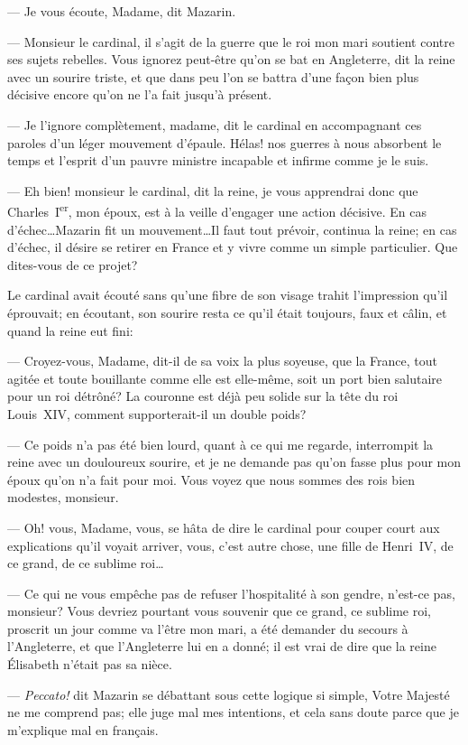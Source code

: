— Je vous écoute, Madame, dit Mazarin.

— Monsieur le cardinal, il s'agit de la guerre que le roi mon mari soutient contre ses sujets rebelles. Vous ignorez peut-être qu'on se bat en Angleterre, dit la reine avec un sourire triste, et que dans peu l'on se battra d'une façon bien plus décisive encore qu'on ne l'a fait jusqu'à présent.

— Je l'ignore complètement, madame, dit le cardinal en accompagnant ces paroles d'un léger mouvement d'épaule. Hélas! nos guerres à nous absorbent le temps et l'esprit d'un pauvre ministre incapable et infirme comme je le suis.

— Eh bien! monsieur le cardinal, dit la reine, je vous apprendrai donc que Charles~I\textsuperscript{er}, mon époux, est à la veille d'engager une action décisive. En cas d'échec\dots Mazarin fit un mouvement\dots Il faut tout prévoir, continua la reine; en cas d'échec, il désire se retirer en France et y vivre comme un simple particulier. Que dites-vous de ce projet?

Le cardinal avait écouté sans qu'une fibre de son visage trahit l'impression qu'il éprouvait; en écoutant, son sourire resta ce qu'il était toujours, faux et câlin, et quand la reine eut fini:

— Croyez-vous, Madame, dit-il de sa voix la plus soyeuse, que la France, tout agitée et toute bouillante comme elle est elle-même, soit un port bien salutaire pour un roi détrôné? La couronne est déjà peu solide sur la tête du roi Louis~XIV, comment supporterait-il un double poids?

— Ce poids n'a pas été bien lourd, quant à ce qui me regarde, interrompit la reine avec un douloureux sourire, et je ne demande pas qu'on fasse plus pour mon époux qu'on n'a fait pour moi. Vous voyez que nous sommes des rois bien modestes, monsieur.

— Oh! vous, Madame, vous, se hâta de dire le cardinal pour couper court aux explications qu'il voyait arriver, vous, c'est autre chose, une fille de Henri~IV, de ce grand, de ce sublime roi\dots

— Ce qui ne vous empêche pas de refuser l'hospitalité à son gendre, n'est-ce pas, monsieur? Vous devriez pourtant vous souvenir que ce grand, ce sublime roi, proscrit un jour comme va l'être mon mari, a été demander du secours à l'Angleterre, et que l'Angleterre lui en a donné; il est vrai de dire que la reine Élisabeth n'était pas sa nièce.

— \textit{Peccato!} dit Mazarin se débattant sous cette logique si simple, Votre Majesté ne me comprend pas; elle juge mal mes intentions, et cela sans doute parce que je m'explique mal en français.

